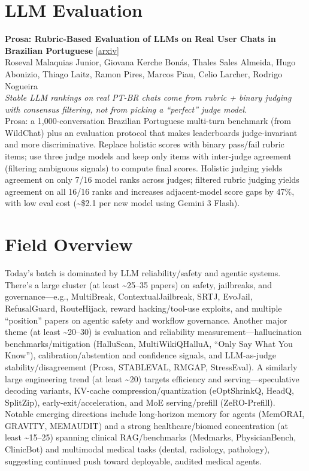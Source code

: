 \documentclass[12pt,letterpaper]{article}
\begin{document}
\medskip


\section*{LLM Evaluation}

{\small\textbf{Prosa: Rubric-Based Evaluation of LLMs on Real User Chats in Brazilian Portuguese}} {\scriptsize[\href{https://arxiv.org/abs/2605.01630}{arxiv}]}\\
{\scriptsize Roseval Malaquias Junior, Giovana Kerche Bon\'as, Thales Sales Almeida, Hugo Abonizio, Thiago Laitz, Ramon Pires, Marcos Piau, Celio Larcher, Rodrigo Nogueira}\\

{\small\textit{Stable LLM rankings on real PT-BR chats come from rubric + binary judging with consensus filtering, not from picking a ``perfect'' judge model.}}\\[1pt]
{\footnotesize Prosa: a 1,000-conversation Brazilian Portuguese multi-turn benchmark (from WildChat) plus an evaluation protocol that makes leaderboards judge-invariant and more discriminative. Replace holistic scores with binary pass/fail rubric items; use three judge models and keep only items with inter-judge agreement (filtering ambiguous signals) to compute final scores. Holistic judging yields agreement on only 7/16 model ranks across judges; filtered rubric judging yields agreement on all 16/16 ranks and increases adjacent-model score gaps by 47\%, with low eval cost (\textasciitilde{}\$2.1 per new model using Gemini 3 Flash).}

\medskip



\section*{Field Overview}
{\footnotesize Today's batch is dominated by LLM reliability/safety and agentic systems. There's a large cluster (at least \textasciitilde{}25--35 papers) on safety, jailbreaks, and governance---e.g., MultiBreak, ContextualJailbreak, SRTJ, EvoJail, RefusalGuard, RouteHijack, reward hacking/tool-use exploits, and multiple ``position'' papers on agentic safety and workflow governance. Another major theme (at least \textasciitilde{}20--30) is evaluation and reliability measurement---hallucination benchmarks/mitigation (HalluScan, MultiWikiQHalluA, ``Only Say What You Know''), calibration/abstention and confidence signals, and LLM-as-judge stability/disagreement (Prosa, STABLEVAL, RMGAP, StressEval). A similarly large engineering trend (at least \textasciitilde{}20) targets efficiency and serving---speculative decoding variants, KV-cache compression/quantization (eOptShrinkQ, HeadQ, SplitZip), early-exit/acceleration, and MoE serving/prefill (ZeRO-Prefill). Notable emerging directions include long-horizon memory for agents (MemORAI, GRAVITY, MEMAUDIT) and a strong healthcare/biomed concentration (at least \textasciitilde{}15--25) spanning clinical RAG/benchmarks (Medmarks, PhysicianBench, ClinicBot) and multimodal medical tasks (dental, radiology, pathology), suggesting continued push toward deployable, audited medical agents.}
\end{document}
